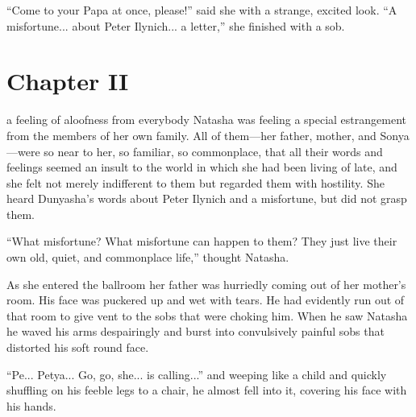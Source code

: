 ``Come to your Papa at once, please!'' said she with a strange,
excited look. ``A misfortune... about Peter Ilynich... a
letter,'' she finished with a sob.


\chapter*{Chapter II}
\ifaudio 
{}
\fi

 a feeling of aloofness from everybody Natasha was feeling
a special estrangement from the members of her own family. All of
them---her father, mother, and Sonya---were so near to her, so
familiar, so commonplace, that all their words and feelings
seemed an insult to the world in which she had been living of
late, and she felt not merely indifferent to them but regarded
them with hostility. She heard Dunyasha's words about Peter
Ilynich and a misfortune, but did not grasp them.

``What misfortune? What misfortune can happen to them? They just
live their own old, quiet, and commonplace life,'' thought
Natasha.

As she entered the ballroom her father was hurriedly coming out
of her mother's room. His face was puckered up and wet with
tears. He had evidently run out of that room to give vent to the
sobs that were choking him. When he saw Natasha he waved his arms
despairingly and burst into convulsively painful sobs that
distorted his soft round face.

``Pe... Petya... Go, go, she... is calling...'' and weeping like
a child and quickly shuffling on his feeble legs to a chair, he
almost fell into it, covering his face with his hands.

